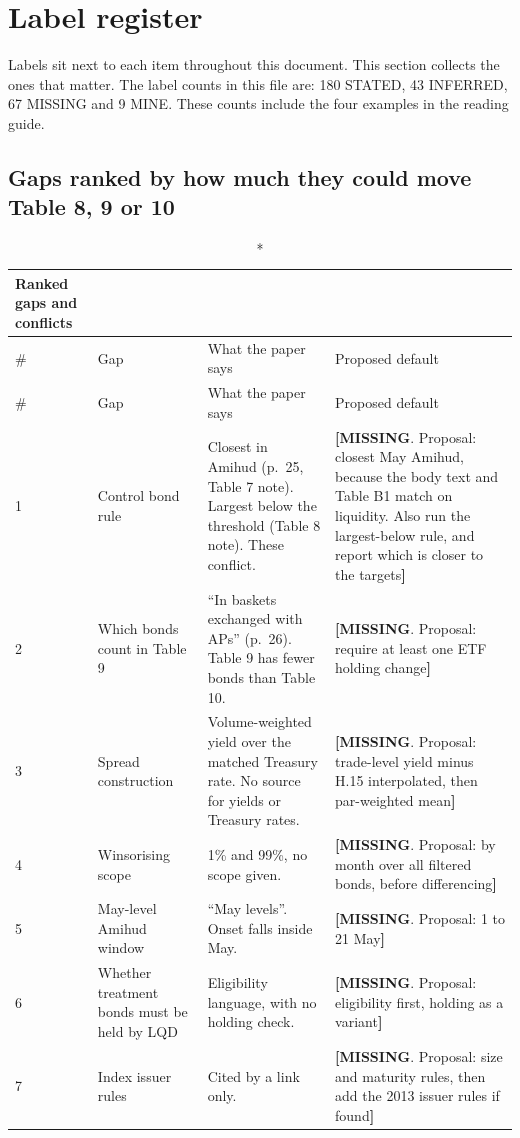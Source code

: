 \documentclass[10pt,a4paper]{article}
\newcommand{\MI}[1]{\textcolor{cmi}{\textbf{[MISSING}. Proposal: #1\textbf{]}}}
\begin{document}
\section{Label register}\label{sec:register}

Labels sit next to each item throughout this document. This section collects the ones that matter. The label counts in this file are: 180 STATED, 43 INFERRED, 67 MISSING and 9 MINE. These counts include the four examples in the reading guide.

\subsection{Gaps ranked by how much they could move Table 8, 9 or 10}\label{sec:gaps}
\begin{longtable}{@{}P{0.5cm}P{4.8cm}P{5.4cm}P{5.8cm}@{}}
\caption*{\textbf{Ranked gaps and conflicts}}\\
\toprule
\# & Gap & What the paper says & Proposed default\\
\midrule\endfirsthead
\toprule \# & Gap & What the paper says & Proposed default\\ \midrule{} & Control bond rule & Closest in Amihud (p.~25, Table 7 note). Largest below the threshold (Table 8 note). These conflict. & \MI{closest May Amihud, because the body text and Table B1 match on liquidity. Also run the largest-below rule, and report which is closer to the targets}\\
2 & Which bonds count in Table 9 & ``In baskets exchanged with APs'' (p.~26). Table 9 has fewer bonds than Table 10. & \MI{require at least one ETF holding change}\\
3 & Spread construction & Volume-weighted yield over the matched Treasury rate. No source for yields or Treasury rates. & \MI{trade-level yield minus H.15 interpolated, then par-weighted mean}\\
4 & Winsorising scope & 1\% and 99\%, no scope given. & \MI{by month over all filtered bonds, before differencing}\\
5 & May-level Amihud window & ``May levels''. Onset falls inside May. & \MI{1 to 21 May}\\
6 & Whether treatment bonds must be held by LQD & Eligibility language, with no holding check. & \MI{eligibility first, holding as a variant}\\
7 & Index issuer rules & Cited by a link only. & \MI{size and maturity rules, then add the 2013 issuer rules if found}\\

\end{longtable}
\end{document}
